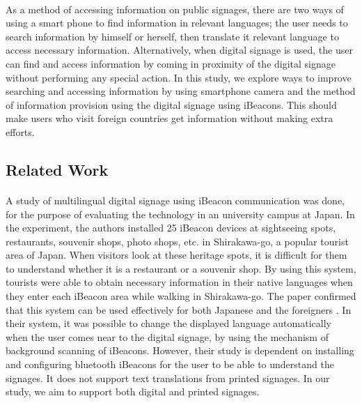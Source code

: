 \documentclass[12pt]{article}
\begin{document}
\paragraph{}As a method of accessing information on public signages, there are two ways of using a smart phone to find information in relevant languages; the user needs to search information by himself or herself, then translate it relevant language to access necessary information. Alternatively, when digital signage is used, the user can find and access information by coming in proximity of the digital signage without performing any special action. In this study, we explore ways to improve searching and accessing information by using smartphone camera and the method of information provision using the digital signage using iBeacons. This should make users who visit foreign countries get information without making extra efforts. 

\subsection{Related Work}

\paragraph{} A study of multilingual digital signage using iBeacon communication was done, for the purpose of evaluating the technology in an university campus at Japan.  \cite{one} In the experiment, the authors installed 25 iBeacon devices at sightseeing spots, restaurants, souvenir shops, photo shops, etc. in Shirakawa-go, a popular tourist area of Japan. When visitors look at these heritage spots, it is difficult for them to understand whether it is a restaurant or a souvenir shop. By using this system, tourists were able to obtain necessary information in their native languages when they enter each iBeacon area while walking in Shirakawa-go. The paper confirmed that this system can be used effectively for both Japanese and the foreigners \cite{one}.  In their system, it was possible to change the displayed language automatically when the user comes near to the digital signage, by using the mechanism of background scanning of iBeacons. However, their study is dependent on installing and configuring bluetooth iBeacons for the user to be able to understand the signages. It does not support text translations from printed signages. In our study, we aim to support both digital and printed signages.
\end{document}
